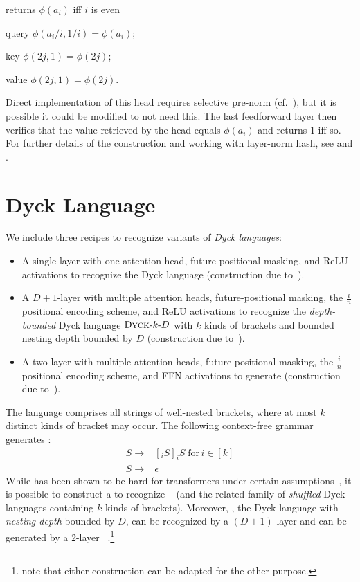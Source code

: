 \begin{head}{returns $\phi(a_i)$ iff $i$ is even}
    \item query $\phi(a_i/i, 1/i) = \phi(a_i)$;
    \item key $\phi(2j, 1) = \phi(2j)$;
    \item value $\phi(2j, 1) = \phi(2j)$.
\end{head}

Direct implementation of this head requires selective pre-norm (cf.~), but it is possible it could be modified to not need this.
The last feedforward layer then verifies that the value retrieved by the head equals $\phi(a_i)$ and returns 1 iff so.
For further details of the construction and working with layer-norm hash, see  and \citet{merrill-2024-little-depth,merrill-sabharwal-2024-cot}.

\section{Dyck Language}
We include three recipes to recognize variants of \textit{Dyck languages}:\begin{itemize}
    \item A single-layer \SMAT{} with one attention head, future positional masking, and ReLU activations to recognize the Dyck language  (construction due to~\citet{bhattamishra2020ability}).
    \item A $D{+}1$-layer \UHAT{} with multiple attention heads, future-positional masking, the $\frac{i}{n}$ positional encoding scheme, and ReLU activations to recognize the \textit{depth-bounded} Dyck language $\textsc{Dyck}\text{-}k\text{-}D$ with $k$ kinds of brackets and bounded nesting depth bounded by $D$ (construction due to~\citet{yao-2021-self-attention}).
    \item A two-layer with multiple attention heads, future-positional masking, the $\frac{i}{n}$ positional encoding scheme, and FFN activations to generate  (construction due to~\citet{yao-2021-self-attention}).
    
\end{itemize}

The language  comprises all strings of well-nested brackets, where at most $k$ distinct kinds of bracket may occur. The following context-free grammar generates :\begin{align*}
    S \rightarrow & [_i S]_iS \; \text{for}\, i \in [k]\\
    S \rightarrow & \epsilon
\end{align*}
While  has been shown to be hard for transformers under certain assumptions~\citep{hahn-2020-theoretical,bhattamishra2020ability}, it is possible to construct a \SMAT{} to recognize ~\citet{bhattamishra2020ability} (and the related family of \textit{shuffled} Dyck languages containing $k$ kinds of brackets). Moreover, , the Dyck language with \textit{nesting depth} bounded by $D$, can be recognized by a $(D+1)$-layer \UHAT{} and can be generated by a $2$-layer ~\citep{yao-2021-self-attention}.\footnote{\citet{yao-2021-self-attention} note that either construction can be adapted for the other purpose.}


